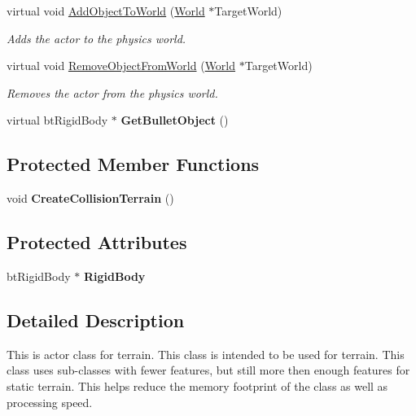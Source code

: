 \begin{DoxyCompactItemize}
virtual void \hyperlink{classphys_1_1ActorTerrain_a890ee6f67fda30381bce9c949ae36566}{AddObjectToWorld} (\hyperlink{classphys_1_1World}{World} $\ast$TargetWorld)
\begin{DoxyCompactList}\small\item\em Adds the actor to the physics world. \item\end{DoxyCompactList}\item 
virtual void \hyperlink{classphys_1_1ActorTerrain_aeded1fdabfc4dd407f81fcc5b97c1f77}{RemoveObjectFromWorld} (\hyperlink{classphys_1_1World}{World} $\ast$TargetWorld)
\begin{DoxyCompactList}\small\item\em Removes the actor from the physics world. \item\end{DoxyCompactList}\item 
\hypertarget{classphys_1_1ActorTerrain_a1bed32f1b9afd1bd28c231b7505c267e}{
virtual btRigidBody $\ast$ {\bfseries GetBulletObject} ()}
\label{de/d74/classphys_1_1ActorTerrain_a1bed32f1b9afd1bd28c231b7505c267e}

\end{DoxyCompactItemize}
\subsection*{Protected Member Functions}
\begin{DoxyCompactItemize}
\item 
\hypertarget{classphys_1_1ActorTerrain_ade758919c0f2b58ad1fe4bfd388d79af}{
void {\bfseries CreateCollisionTerrain} ()}
\label{de/d74/classphys_1_1ActorTerrain_ade758919c0f2b58ad1fe4bfd388d79af}

\end{DoxyCompactItemize}
\subsection*{Protected Attributes}
\begin{DoxyCompactItemize}
\item 
\hypertarget{classphys_1_1ActorTerrain_a86b22aad61a7ffceb5c757ddcbca48c3}{
btRigidBody $\ast$ {\bfseries RigidBody}}
\label{de/d74/classphys_1_1ActorTerrain_a86b22aad61a7ffceb5c757ddcbca48c3}

\end{DoxyCompactItemize}


\subsection{Detailed Description}
This is actor class for terrain. This class is intended to be used for terrain. This class uses sub-\/classes with fewer features, but still more then enough features for static terrain. This helps reduce the memory footprint of the class as well as processing speed. 

